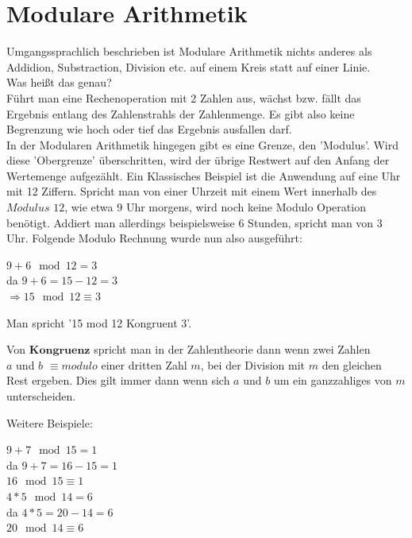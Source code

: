 \documentclass[a4paper,12pt]{scrartcl}
\begin{document}
\section{Modulare Arithmetik}
Umgangssprachlich beschrieben ist Modulare Arithmetik nichts anderes als Addidion, Substraction, Division etc. auf einem Kreis statt auf einer Linie. \\
Was heißt das genau?\\
Führt man eine Rechenoperation mit 2 Zahlen aus, wächst bzw. fällt das Ergebnis entlang des Zahlenstrahls der Zahlenmenge. 
Es gibt also keine Begrenzung wie hoch oder tief das Ergebnis ausfallen darf.\\
In der Modularen Arithmetik hingegen gibt es eine Grenze, den 'Modulus'. Wird diese 'Obergrenze' überschritten, wird der übrige Restwert auf den Anfang der Wertemenge aufgezählt. Ein Klassisches Beispiel ist die Anwendung auf eine Uhr mit 12 Ziffern. Spricht man von einer Uhrzeit mit einem Wert innerhalb des $Modulus$ $12$, wie etwa 9 Uhr morgens, wird noch keine Modulo Operation benötigt. Addiert man allerdings beispielsweise 6 Stunden, spricht man von 3 Uhr. Folgende Modulo Rechnung wurde nun also ausgeführt:
\begin{center}
  $9 + 6 \mod 12 = 3$ \\
   da $9 + 6 = 15         
         -         12 = 3$\\
   $\Rightarrow 15 \mod 12 \equiv 3$\\

\end{center}
  Man spricht '15 mod 12 Kongruent 3'.\newline

Von $\textbf {Kongruenz}$ spricht man in der Zahlentheorie dann wenn zwei Zahlen\\ $a$ und $b$ $\equiv modulo$ einer dritten Zahl $m$, bei der Division mit $m$ den gleichen Rest ergeben. Dies gilt immer dann wenn sich $a$ und $b$ um ein ganzzahliges von $m$ unterscheiden.


 Weitere Beispiele:

 \begin{center}
  $9 + 7 \mod 15 = 1$\\
  da $9 + 7 = 16 - 15 = 1$\\
  $16 \mod 15 \equiv 1$\\[0.3in]
  
  
  $4 * 5 \mod 14 = 6$\\
  da $4 * 5 = 20 - 14 = 6$\\
  $20 \mod 14 \equiv 6$

 \end{center}
 
\end{document}

